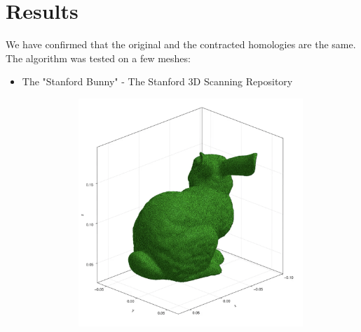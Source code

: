 \documentclass{ijclclp}
\begin{document}
\section{Results}
We have confirmed that the original and the contracted homologies are the same. The algorithm was tested on a few meshes:
\begin{itemize}
\item The "Stanford Bunny" - The Stanford 3D Scanning Repository
\begin{figure}[h]
\centering
\begin{subfigure}{.4\textwidth}
  \centering
  \includegraphics[width=\linewidth]{buni1.png}
\end{subfigure}
\begin{subfigure}{.4\textwidth}
  \centering

\end{subfigure}
\end{figure}
\end{itemize}
\end{document}
